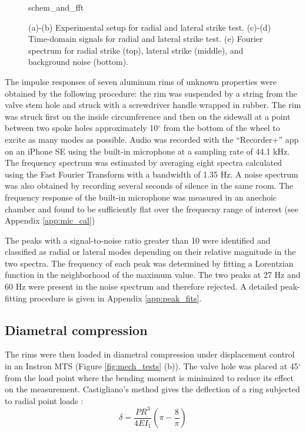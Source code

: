 \documentclass[../thesis.tex]{subfiles}
\begin{document}
\begin{figure}
\centering
{schem_and_fft}
\caption{(a)-(b) Experimental setup for radial and lateral strike test. (c)-(d) Time-domain signals for radial and lateral strike test. (e) Fourier spectrum for radial strike (top), lateral strike (middle), and background noise (bottom).}
\label{fig:schem}
\end{figure}

The impulse responses of seven aluminum rims of unknown properties were obtained by the following procedure: the rim was suspended by a string from the valve stem hole and struck with a screwdriver handle wrapped in rubber. The rim was struck first on the inside circumference and then on the sidewall at a point between two spoke holes approximately 10$^{\circ}$ from the bottom of the wheel to excite as many modes as possible. Audio was recorded with the ``Recorder+'' app on an iPhone SE using the built-in microphone at a sampling rate of 44.1 kHz. The frequency spectrum was estimated by averaging eight spectra calculated using the Fast Fourier Transform with a bandwidth of 1.35 Hz. A noise spectrum was also obtained by recording several seconds of silence in the same room. The frequency response of the built-in microphone was measured in an anechoic chamber and found to be sufficiently flat over the frequecny range of interest (see Appendix \ref{app:mic_cal})

The peaks with a signal-to-noise ratio greater than 10 were identified and classified as radial or lateral modes depending on their relative magnitude in the two spectra. The frequency of each peak was determined by fitting a Lorentzian function in the neighborhood of the maximum value. The two peaks at 27 Hz and 60 Hz were present in the noise spectrum and therefore rejected. A detailed peak-fitting procedure is given in Appendix \ref{app:peak_fits}.

\subsection{Diametral compression}
The rims were then loaded in diametral compression under displacement control in an Instron MTS (Figure \ref{fig:mech_tests} (b)). The valve hole was placed at 45$^{\circ}$ from the load point where the bending moment is minimized to reduce its effect on the measurement. Castigliano's method gives the deflection of a ring subjected to radial point loads \cite{Timoshenko1961a}:
  \begin{equation}\label{eq:def_rad}
  \delta = \frac{PR^3}{4EI_1} \left(\pi-\frac{8}{\pi} \right)
  \end{equation}
\end{document}
